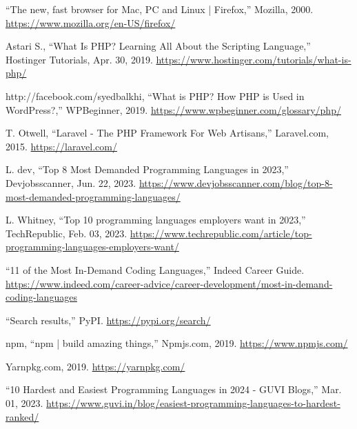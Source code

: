 \documentclass[12pt]{report} %
\begin{document}
\begin{singlespace}
\begin{thebibliography}{}
             “The new, fast browser for Mac, PC and Linux | Firefox,” Mozilla, 2000. \href{https://www.mozilla.org/en-US/firefox/}{https://www.mozilla.org/en-US/firefox/}
        
             Astari S., “What Is PHP? Learning All About the Scripting Language,” Hostinger Tutorials, Apr. 30, 2019. \href{https://www.hostinger.com/tutorials/what-is-php/}{https://www.hostinger.com/tutorials/what-is-php/}

             http://facebook.com/syedbalkhi, “What is PHP? How PHP is Used in WordPress?,” WPBeginner, 2019. \href{https://www.wpbeginner.com/glossary/php/}{https://www.wpbeginner.com/glossary/php/}

             T. Otwell, “Laravel - The PHP Framework For Web Artisans,” Laravel.com, 2015. \href{https://laravel.com/}{https://laravel.com/}

             L. dev, “Top 8 Most Demanded Programming Languages in 2023,” Devjobsscanner, Jun. 22, 2023. \href{https://www.devjobsscanner.com/blog/top-8-most-demanded-programming-languages/}{https://www.devjobsscanner.com/blog/top-8-most-demanded-programming-languages/}

             L. Whitney, “Top 10 programming languages employers want in 2023,” TechRepublic, Feb. 03, 2023. \href{https://www.techrepublic.com/article/top-programming-languages-employers-want/}{https://www.techrepublic.com/article/top-programming-languages-employers-want/}

             “11 of the Most In-Demand Coding Languages,” Indeed Career Guide. \href{https://www.indeed.com/career-advice/career-development/most-in-demand-coding-languages}{https://www.indeed.com/career-advice/career-development/most-in-demand-coding-languages}

             “Search results,” PyPI. \href{https://pypi.org/search/}{https://pypi.org/search/}

             npm, “npm | build amazing things,” Npmjs.com, 2019. \href{https://www.npmjs.com/}{https://www.npmjs.com/}

             Yarnpkg.com, 2019. \href{https://yarnpkg.com/}{https://yarnpkg.com/}

             “10 Hardest and Easiest Programming Languages in 2024 - GUVI Blogs,” Mar. 01, 2023. \href{https://www.guvi.in/blog/easiest-programming-languages-to-hardest-ranked/}{https://www.guvi.in/blog/easiest-programming-languages-to-hardest-ranked/}


\end{thebibliography}
\end{singlespace}
\end{document}

